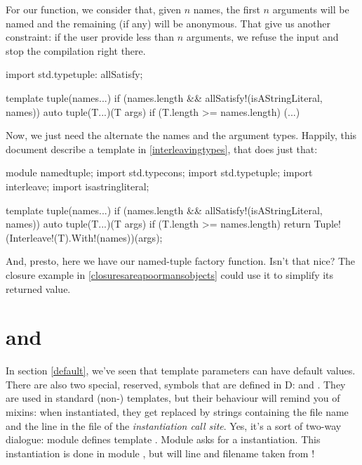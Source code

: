 For our function, we consider that, given $n$ names, the first $n$ arguments will be named and the remaining (if any) will be anonymous. That give us another constraint: if the user provide less than $n$ arguments, we refuse the input and stop the compilation right there.

\begin{dcode}
import std.typetuple: allSatisfy;

template tuple(names...) 
if (names.length && allSatisfy!(isAStringLiteral, names))
{
    auto tuple(T...)(T args) if (T.length >= names.length)
    {
    (...)
    }
}
\end{dcode}

Now, we just need the alternate the names and the argument types. Happily, this document describe a  template in \ref{interleavingtypes}, that does just that:

\begin{dcode}
module namedtuple;
import std.typecons;
import std.typetuple;
import interleave;
import isastringliteral;

template tuple(names...) 
if (names.length && allSatisfy!(isAStringLiteral, names))
{
    auto tuple(T...)(T args) if (T.length >= names.length)
    {
        return Tuple!(Interleave!(T).With!(names))(args);
    }
}
\end{dcode}

And, presto, here we have our named-tuple factory function. Isn't that nice? The closure example in \ref{closuresareapoormansobjects} could use it to simplify its returned value.


\section{\texorpdfstring{ and }
                        {\_\_FILE\_\_ and \_\_LINE\_\_}}
\label{fileandline}


In section \ref{default}, we've seen that template parameters can have default values. There are also two special, reserved, symbols that are defined in D:  and . They are used in standard (non-) templates, but their behaviour will remind you of mixins: when instantiated, they get replaced by strings containing the file name and the line in the file of the \emph{instantiation call site}. Yes, it's a sort of two-way dialogue: module  defines template . Module  asks for a  instantiation. This instantiation is done in module , but will line and filename taken from !

